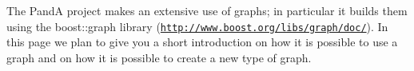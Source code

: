 The PandA project makes an extensive use of graphs; in particular it builds them using the boost\+::graph library (\href{http://www.boost.org/libs/graph/doc/}{\tt http\+://www.\+boost.\+org/libs/graph/doc/}). In this page we plan to give you a short introduction on how it is possible to use a graph and on how it is possible to create a new type of graph. 